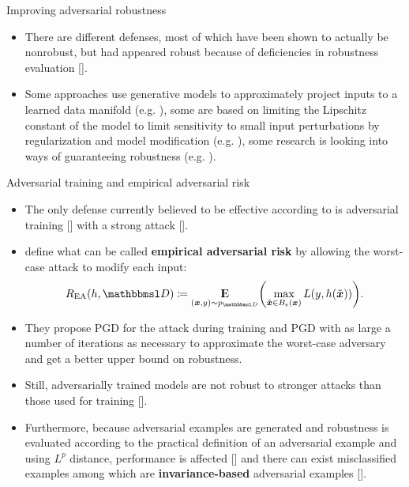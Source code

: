 \documentclass{beamer}
\newcommand{\citet}[1]{{\color{citecolor}\relscale{0.8}\textcite{#1}}}
\newcommand{\citep}[1]{{\color{citecolor}\relscale{0.8}[\textcite{#1}]}}
\begin{document}
\begin{frame}[allowframebreaks=0.9]{Improving adversarial robustness}
	\begin{itemize}
		\item There are different defenses, most of which have been shown to actually be nonrobust, but had appeared robust because of deficiencies in robustness evaluation  \citep{Carlini:2017:AEANEDBTM,Athalye:2018:OGGFSS,Uesato:2018:ARDEAWA,Carlini:2017:TERNN}.
		\item Some approaches use generative models to approximately project inputs to a learned data manifold (e.g. \citet{Samangouei:2018:DGPCAAAUGM}), some are based on limiting the Lipschitz constant of the model to limit sensitivity to small input perturbations by regularization and model modification (e.g. \citet{Qian:2018:L2NNN}), some research is looking into ways of guaranteeing robustness (e.g. \citet{Cohen:2019:CARRS}).
	\end{itemize}
\end{frame}

\begin{frame}[allowframebreaks=0.9]{Adversarial training and empirical
		adversarial risk}
	\begin{itemize}
		\item The only defense currently believed to be effective according to \citet{Athalye:2018:OGGFSS} is adversarial training \citep{Goodfellow:2014:EHAE} with a strong attack \citep{Madry:2017:TDLMRAA}.
		
		\item \citet{Madry:2017:TDLMRAA} define what can be called \textbf{empirical adversarial risk} by allowing the worst-case attack to modify each input:
		\begin{align}
		R_\text{EA}(h,\set D) \coloneqq \E_{(\vec x, y)\sim p_{\set D}} \del{\max_{\tilde{\vec x}\in B_\epsilon(\vec x)} L(y,h(\tilde{\vec x}))} \text{.}
		\end{align}
		\item They propose PGD for the attack during training and PGD with as large a number of iterations as necessary to approximate the worst-case adversary and get a better upper bound on robustness.
		
		\item Still, adversarially trained models are not robust to stronger attacks than those used for training \citep{Schott:2018:TDFARNNMM}. 
		\item Furthermore, because adversarial examples are generated and robustness is evaluated according to the practical definition of an adversarial example and using $L^p$ distance, performance is affected \citep{Madry:2017:TDLMRAA,Tsipras:2018:RMBOA} and there can exist misclassified examples among which are \textbf{invariance-based} adversarial examples \citep{Jacobsen:2019:EEICNBAR}.
	\end{itemize}
\end{frame}
\end{document}
